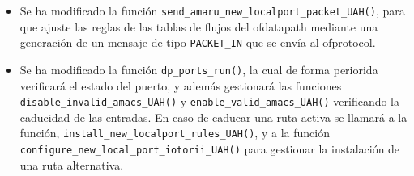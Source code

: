 \begin{itemize}
    \item Se ha modificado la función \texttt{send\_amaru\_new\_localport\_packet\_UAH()}, para que ajuste las reglas de las tablas de flujos del ofdatapath mediante una generación de un mensaje de tipo \texttt{PACKET\_IN} que se envía al ofprotocol.
    \item Se ha modificado la función \texttt{dp\_ports\_run()}, la cual de forma periorida verificará el estado del puerto, y además gestionará las funciones \texttt{disable\_invalid\_amacs\_UAH()} y \texttt{enable\_valid\_amacs\_UAH()} verificando la caducidad de las entradas. En caso de caducar una ruta activa se llamará a la función, \texttt{install\_new\_localport\_rules\_UAH()}, y a la función \texttt{configure\_new\_local\_port\_iotorii\_UAH()} para gestionar la instalación de una ruta alternativa.
\end{itemize}